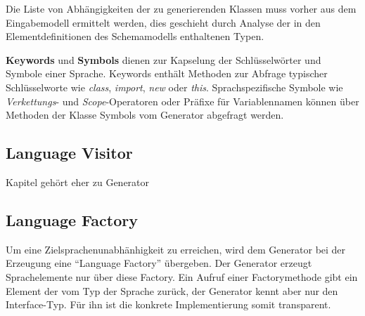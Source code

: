 Die Liste von Abhängigkeiten der zu generierenden Klassen muss vorher aus dem Eingabemodell ermittelt werden, dies geschieht durch Analyse der in den Elementdefinitionen des Schemamodells enthaltenen Typen. 


\textbf{Keywords} und \textbf{Symbols} dienen zur Kapselung der Schlüsselwörter und Symbole einer Sprache. Keywords enthält Methoden zur Abfrage typischer Schlüsselworte wie \emph{class}, \emph{import}, \emph{new} oder \emph{this}. Sprachspezifische Symbole wie \emph{Verkettungs}- und \emph{Scope}-Operatoren oder Präfixe für Variablennamen können über Methoden der Klasse Symbols vom Generator abgefragt werden.

\subsection{Language Visitor}
\label{sec:language_visitor}

Kapitel gehört eher zu Generator

\subsection{Language Factory}
\label{sec:language_factory}

Um eine Zielsprachenunabhänhigkeit zu erreichen, wird dem Generator bei der Erzeugung eine \enquote{Language Factory} übergeben. Der Generator erzeugt Sprachelemente nur über diese Factory. Ein Aufruf einer Factorymethode gibt ein Element der vom Typ der Sprache zurück, der Generator kennt aber nur den Interface-Typ. Für ihn ist die konkrete Implementierung somit transparent.
